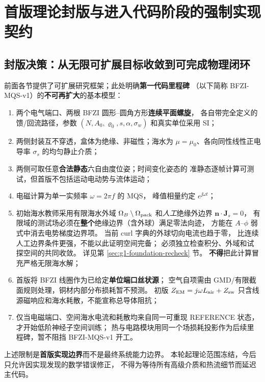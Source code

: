 \section{首版理论封版与进入代码阶段的强制实现契约}\label{sec:freeze}
\subsection{封版决策：从无限可扩展目标收敛到可完成物理闭环}
前面各节提供了可扩展研究框架；此处明确\textbf{第一代码里程碑}
（以下简称 BFZI-MQS-v1）的\textbf{不可再扩大}的基本模型：
\begin{enumerate}
\item 两个电气端口、两根 BFZI 圆形--圆角方形\textbf{连续平面螺旋}，
各自带完全定义的馈/回流路径，参数
\((N,A_0,\varrho_0,s,\alpha,\sigma_w)\) 和真实单位采用 SI；
\item 两侧封装互不穿透，盒体为绝缘、非磁性；海水为
\(\mu=\mu_0\)、各向同性线性正电导率
\(\sigma_s\) 的均匀静止介质；
\item 两侧可取任意\textbf{合法静态}六自由度位姿；时间变化姿态的
准静态逐帧计算可测试，但首版不包括运动电动势与流体运动；
\item 电磁计算为单一实频率 \(\omega=2\pi f\) 的 MQS，
峰值相量约定 \(e^{\jj\omega t}\)；
\item 初始海水教师采用有限海水外域 \(\Omega_B\setminus\Omega_{\rm pack}\)
和\emph{人工}绝缘外边界 \(\bm n\cdot\bm J_s=0\)，
有限域的测试场必须在\textbf{整个}绝缘边界（含外球）满足零法向迹，
方能在 \(A\)--\(\phi\) 弱式中消去电势梯度边界项。
当前 curl 字典的外球切向电流也趋于零，
比连续人工边界条件更强，不能以此证明空间完备；
必须独立检查积分、外域和试探空间的共同收敛。
详见第 \ref{sec:g1-foundation-recheck} 节。
\textbf{不得}把此计算冒充严格无限海水解；
\item 首版将 BFZI 线圈作为已给定\textbf{单位端口丝状源}；
空气自项需由 GMD/有限截面规则处理，铜材内部分布损耗暂不预测。
初版 \(Z_{\rm EM}=j\omega L_{\rm air}+Z_{\rm sw}\)
只含线源磁响应和海水耗散，不能宣称总导体阻抗；
\item 仅当电磁端口、空间海水电流和耗散均来自同一可重现
REFERENCE 状态，才开始低阶神经子空间训练；
热与电路模块用同一个场损耗投影作为后续里程碑，暂不阻挡
BFZI-MQS-v1 开工。
\end{enumerate}
上述限制是\textbf{首版实现边界}而不是最终系统能力边界。
本轮起理论范围冻结，今后只允许因实现发现的数学错误修正，
不得为等待所有高级介质和热流细节而延迟主代码。

